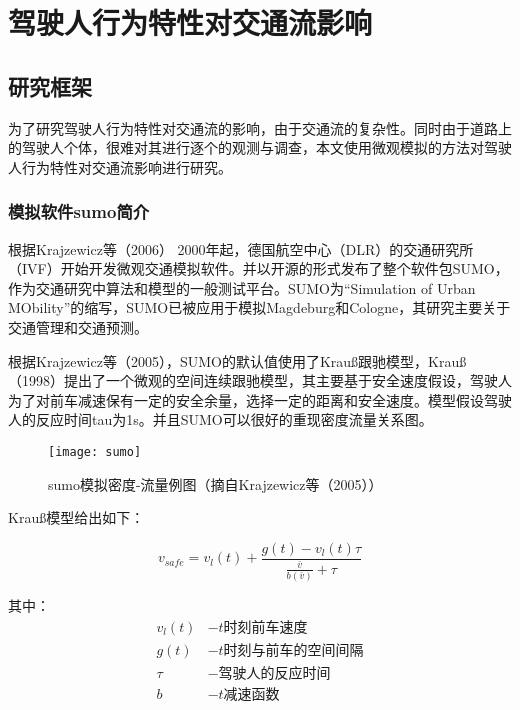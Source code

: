 \chapter{驾驶人行为特性对交通流影响}
\section{研究框架}
为了研究驾驶人行为特性对交通流的影响，由于交通流的复杂性。同时由于道路上的驾驶人个体，很难对其进行逐个的观测与调查，本文使用微观模拟的方法对驾驶人行为特性对交通流影响进行研究。
\subsection{模拟软件sumo简介}

根据Krajzewicz等（2006）\cite{Krajzewicz2006}
2000年起，德国航空中心（DLR）的交通研究所（IVF）开始开发微观交通模拟软件。并以开源的形式发布了整个软件包SUMO，作为交通研究中算法和模型的一般测试平台。SUMO为“Simulation of Urban MObility”的缩写，SUMO已被应用于模拟Magdeburg和Cologne，其研究主要关于交通管理和交通预测。

根据Krajzewicz等（2005）\cite{Krajzewicz2005}，SUMO的默认值使用了Krauß跟驰模型，Krauß（1998）\cite{Krauss1998}提出了一个微观的空间连续跟驰模型，其主要基于安全速度假设，驾驶人为了对前车减速保有一定的安全余量，选择一定的距离和安全速度。模型假设驾驶人的反应时间tau为1s。并且SUMO可以很好的重现密度流量关系图。

\begin{figure}[!htb]
\begin{center}
\texttt{[image: sumo]}
\end{center}
\caption{sumo模拟密度-流量例图（摘自Krajzewicz等（2005）\cite{Krajzewicz2005}）}
\label{sumo}
\end{figure}

Krauß模型给出如下：

\begin{equation}
v_{safe}=v_l(t)+\frac{g(t)-v_l(t)\tau}{\frac{\bar{v}}{b(\bar{v})}+\tau}
\end{equation}

其中：
\begin{displaymath}
{\begin{aligned}
v_l(t)&-t\text{时刻前车速度}\\
g(t)&-t\text{时刻与前车的空间间隔}\\
\tau&-\text{驾驶人的反应时间}\\
b&-t\text{减速函数}\\
\end{aligned}}
\end{displaymath}

